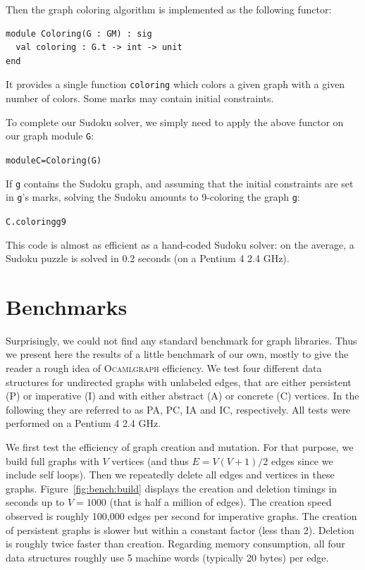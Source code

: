 \documentclass[tfpsymp]{tfp05symp}
\newcommand{\ocamlgraph}{\textsc{Ocamlgraph}\xspace}
\begin{document}
Then the graph coloring algorithm is implemented as the following functor:
\begin{verbatim}
module Coloring(G : GM) : sig
  val coloring : G.t -> int -> unit
end
\end{verbatim}
It provides a single function \texttt{coloring} which colors a given
graph with a given number of colors. Some marks may contain initial
constraints. 

To complete our Sudoku solver, we simply need to apply the above
functor on our graph module \texttt{G}:
\begin{alltt}
module C = Coloring(G)
\end{alltt}
If \texttt{g} contains the Sudoku graph, and
assuming that the initial constraints are set in \texttt{g}'s marks, 
solving the Sudoku amounts to 9-coloring the graph \texttt{g}:
\begin{alltt}
C.coloring g 9
\end{alltt}
This code is almost as efficient as a hand-coded Sudoku solver: on the
average, a Sudoku puzzle is solved in 0.2 seconds (on a Pentium 4 2.4 GHz).

\section{Benchmarks}\label{bench}

Surprisingly, we could not find any standard benchmark for graph
libraries. Thus we present here the results of a little benchmark of
our own, mostly to give the reader a rough idea of \ocamlgraph efficiency.
We test four different data structures for undirected
graphs with unlabeled edges, that are either persistent (P) or
imperative (I) and with either abstract (A) or concrete (C) vertices. In
the following they are referred to as PA, PC, IA and IC, respectively.
All tests were performed on a Pentium 4 2.4 GHz.

We first test the efficiency of graph creation and mutation. 
For that purpose, we build full graphs with $V$ vertices (and thus
$E=V(V+1)/2$ edges since we include self loops). 
Then we repeatedly delete all edges and vertices in these graphs. 
Figure~\ref{fig:bench:build} displays the creation and deletion
timings in seconds up to $V=1000$ (that is half a million of edges). 
The creation speed observed is roughly 100,000 edges per second for
imperative graphs. The creation of persistent graphs is slower but
within a constant factor (less than 2). Deletion is roughly twice
faster than creation.
Regarding memory consumption, all four data structures roughly use 5
machine words (typically 20 bytes) per edge.
\end{document}
